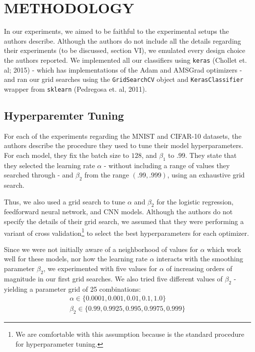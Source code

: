\documentclass[letterpaper, 10 pt, conference]{ieeeconf}  %
\newcommand{\code}[1]{\colorbox{light-gray}{\texttt{#1}}}
\begin{document}
\section{METHODOLOGY}

In our experiments, we aimed to be faithful to the experimental setups the authors describe. Although the authors do not include all the details regarding their experiments (to be discussed, section VI), we emulated every design choice the authors reported. We implemented all our classifiers using \texttt{keras} (Chollet et. al; 2015) - which has implementations of the Adam and AMSGrad optimizers - and ran our grid searches using the \code{GridSearchCV} object and \code{KerasClassifier} wrapper from \texttt{sklearn} (Pedregosa et. al, 2011).


\subsection{Hyperparemter Tuning}

For each of the experiments regarding the MNIST and CIFAR-10 datasets, the authors describe the procedure they used to tune their model hyperparameters. For each model, they fix the batch size to $128$, and $\beta_1$ to $.99$. They state that they selected the learning rate $\alpha$ - without including a range of values they searched through - and $\beta_2$ from the range $(.99, .999)$, using an exhaustive grid search.

Thus, we also used a grid search to tune $\alpha$ and $\beta_2$ for the logistic regression, feedforward neural network, and CNN models. Although the authors do not specify the details of their grid search, we assumed that they were performing a variant of cross validation\footnote{We are comfortable with this assumption because is the standard procedure for hyperparameter tuning.} to select the best hyperparameters for each optimizer.

Since we were not initially aware of a neighborhood of values for $\alpha$ which work well for these models, nor how the learning rate $\alpha$ interacts with the smoothing parameter $\beta_2$, we experimented with five values for $\alpha$ of increasing orders of magnitude in our first grid searches. We also tried five different values of $\beta_2$ - yielding a parameter grid of 25 combinations:
\begin{gather*}
\alpha \in \{0.0001, 0.001, 0.01, 0.1, 1.0\} \\
\beta_2 \in \{0.99, 0.9925, 0.995, 0.9975, 0.999\}
\end{gather*}
\end{document}
